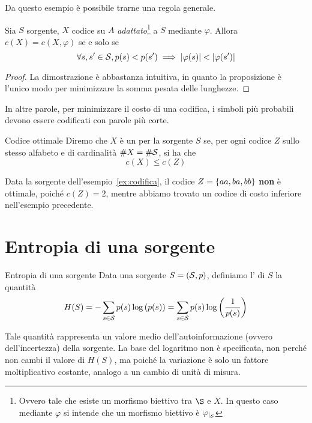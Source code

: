 Da questo esempio è possibile trarne una regola generale.

\begin{proposition}{}
  Sia \(S\) sorgente, \(X\) codice su \(A\) \emph{adattato}\footnote{Ovvero tale che esiste un morfismo biettivo tra \(\S\) e \(X\). In questo caso mediante \(\varphi\) si intende che un morfismo biettivo è \(\varphi_{|_{\mathcal{S}}}\)} a \(S\) mediante \(\varphi\).
  Allora \(c(X) = c(X,\varphi)\) se e solo se
    \[\forall s,s' \in \mathcal{S}, p(s) < p(s') \implies \left|\varphi(s)\right| < \left|\varphi(s')\right| \]
\end{proposition}

\begin{proof}
  La dimostrazione è abbastanza intuitiva, in quanto la proposizione è l'unico modo per minimizzare la somma pesata delle lunghezze.
\end{proof}

In altre parole, per minimizzare il costo di una codifica, i simboli più probabili devono essere codificati con parole più corte.

\begin{definition}{Codice ottimale}
  Diremo che \(X\) è un  per la sorgente \(S\) se, per ogni codice \(Z\) sullo stesso alfabeto e di cardinalità \(\# X = \# \mathcal{S}\), si ha che
  \[c(X) \leq c(Z)\]
\end{definition}

\begin{example}{}
  Data la sorgente dell'esempio~\ref{ex:codifica}, il codice \(Z = \set{aa,ba,bb}\) \textbf{non} è ottimale, poiché \(c(Z) = 2\), mentre abbiamo trovato un codice di costo inferiore nell'esempio precedente.
\end{example}

\section{Entropia di una sorgente}

\begin{definition}{Entropia di una sorgente}
  Data una sorgente \(S = (\mathcal{S},p)\), definiamo l' di \(S\) la quantità
  \[H(S) = -\sum_{s \in \mathcal{S}} p(s) \log\left(p(s)\right) = \sum_{s \in \mathcal{S}} p(s) \log\left(\frac{1}{p(s)}\right)\]  
\end{definition}

Tale quantità rappresenta un valore medio dell'autoinformazione (ovvero dell'incertezza) della sorgente.
La base del logaritmo non è specificata, non perché non cambi il valore di \(H(S)\), ma poiché la variazione è solo un fattore moltiplicativo costante, analogo a un cambio di unità di misura.

